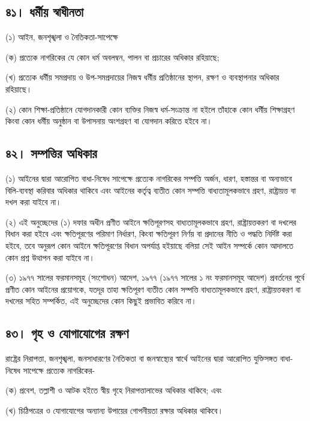 \documentclass[11pt]{article}
\begin{document}
\subsection{৪১। ধর্মীয় স্বাধীনতা}
\label{sec:orga63066c}
(১) আইন, জনশৃঙ্খলা ও নৈতিকতা-সাপেক্ষে

(ক) প্রত্যেক নাগরিকের যে কোন ধর্ম অবলম্বন, পালন বা প্রচারের অধিকার রহিয়াছে;

(খ) প্রত্যেক ধর্মীয় সমপ্রদায় ও উপ-সমপ্রদায়ের নিজস্ব ধর্মীয় প্রতিষ্ঠানের স্থাপন,
    রক্ষণ ও ব্যবস্থাপনার অধিকার রহিয়াছে।

(২) কোন শিক্ষা-প্রতিষ্ঠানে যোগদানকারী কোন ব্যক্তির নিজস্ব ধর্ম-সংক্রান্ত না
    হইলে তাঁহাকে কোন ধর্মীয় শিক্ষাগ্রহণ কিংবা কোন ধর্মীয় অনুষ্ঠান বা উপাসনায়
    অংশগ্রহণ বা যোগদান করিতে হইবে না।

\subsection{৪২। সম্পত্তির অধিকার}
\label{sec:org97f0da0}
(১) আইনের দ্বারা আরোপিত বাধা-নিষেধ সাপেক্ষে প্রত্যেক নাগরিকের সম্পত্তি অর্জন,
    ধারণ, হস্তান্তর বা অন্যভাবে বিলি-ব্যবস্থা করিবার অধিকার থাকিবে এবং আইনের
    কর্তৃত্ব ব্যতীত কোন সম্পত্তি বাধ্যতামূলকভাবে গ্রহণ, রাষ্ট্রায়ত্ত বা দখল করা যাইবে
    না।

(২) এই অনুচ্ছেদের (১) দফার অধীন প্রণীত আইনে ক্ষতিপূরণসহ বাধ্যতামূলকভাবে গ্রহণ,
    রাষ্ট্রায়ত্তকরণ বা দখলের বিধান করা হইবে এবং ক্ষতিপূরণের পরিমাণ নির্ধারণ,
    কিংবা ক্ষতিপূরণ নির্ণয় বা প্রদানের নীতি ও পদ্ধতি নির্দিষ্ট করা হইবে, তবে অনুরূপ
    কোন আইনে ক্ষতিপূরণের বিধান অপর্যাপ্ত হইয়াছে বলিয়া সেই আইন সম্পর্কে কোন
    আদালতে কোন প্রশ্ন উত্থাপন করা যাইবে না।

(৩) ১৯৭৭ সালের ফরমানসমূহ (সংশোধন) আদেশ, ১৯৭৭ (১৯৭৭ সালের ১ নং ফরমানসমূহ
    আদেশ) প্রবর্তনের পূর্বে প্রণীত কোন আইনের প্রয়োগকে, যতদূর তাহা ক্ষতিপূরণ ব্যতীত
    কোন সম্পত্তি বাধ্যতামূলকভাবে গ্রহণ, রাষ্ট্রায়ত্তকরণ বা দখলের সহিত সম্পর্কিত, এই
    অনুচ্ছেদের কোন কিছুই প্রভাবিত করিবে না।

\subsection{৪৩। গৃহ ও যোগাযোগের রক্ষণ}
\label{sec:orgfca8946}
রাষ্ট্রের নিরাপত্তা, জনশৃঙ্খলা, জনসাধারণের নৈতিকতা বা জনস্বাস্থ্যের স্বার্থে
আইনের দ্বারা আরোপিত যুক্তিসঙ্গত বাধা-নিষেধ সাপেক্ষে প্রত্যেক নাগরিকের-

(ক) প্রবেশ, তল্লাশী ও আটক হইতে স্বীয় গৃহে নিরাপত্তালাভের অধিকার থাকিবে; এবং

(খ) চিঠিপত্রের ও যোগাযোগের অন্যান্য উপায়ের গোপনীয়তা রক্ষার অধিকার থাকিবে।
\end{document}

